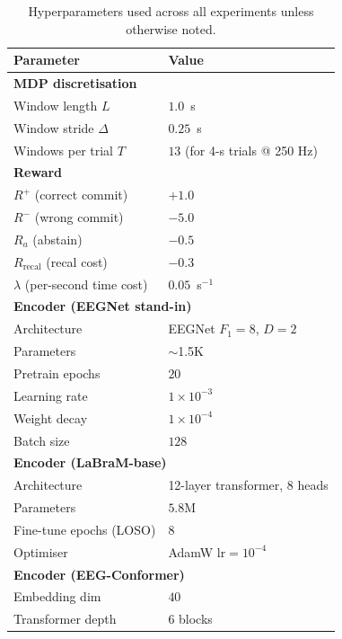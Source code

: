 \documentclass[conference]{IEEEtran}
\begin{document}
\begin{table}[h]
\centering
\caption{Hyperparameters used across all experiments unless
otherwise noted.}
\label{tab:sup:hyperparams}
\footnotesize
\begin{tabular}{l l}
\toprule
Parameter & Value \\
\midrule
\multicolumn{2}{l}{\textbf{MDP discretisation}} \\
Window length $L$              & $1.0$~s \\
Window stride $\Delta$         & $0.25$~s \\
Windows per trial $T$          & $13$ (for 4-s trials @ 250 Hz) \\
\midrule
\multicolumn{2}{l}{\textbf{Reward}} \\
$R^+$ (correct commit)         & $+1.0$ \\
$R^-$ (wrong commit)           & $-5.0$ \\
$R_a$ (abstain)                & $-0.5$ \\
$R_{\text{recal}}$ (recal cost)& $-0.3$ \\
$\lambda$ (per-second time cost)& $0.05$~s$^{-1}$ \\
\midrule
\multicolumn{2}{l}{\textbf{Encoder (EEGNet stand-in)}} \\
Architecture                   & EEGNet $F_1\!=\!8$, $D\!=\!2$ \\
Parameters                     & $\sim$1.5K \\
Pretrain epochs                & $20$ \\
Learning rate                  & $1\!\times\!10^{-3}$ \\
Weight decay                   & $1\!\times\!10^{-4}$ \\
Batch size                     & $128$ \\
\midrule
\multicolumn{2}{l}{\textbf{Encoder (LaBraM-base)}} \\
Architecture                   & 12-layer transformer, 8 heads \\
Parameters                     & $5.8$M \\
Fine-tune epochs (LOSO)        & $8$ \\
Optimiser                      & AdamW $\text{lr}\!=\!10^{-4}$ \\
\midrule
\multicolumn{2}{l}{\textbf{Encoder (EEG-Conformer)}} \\
Embedding dim                  & $40$ \\
Transformer depth              & $6$ blocks \\

\end{tabular}
\end{table}
\end{document}
